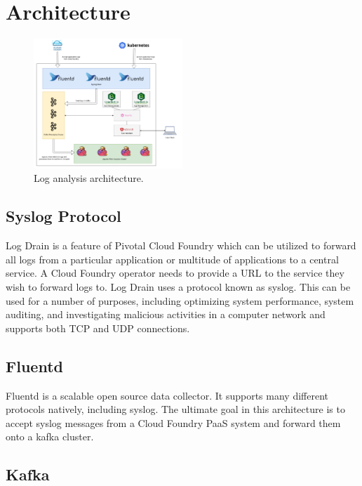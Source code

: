 \section{Architecture}

\begin{figure}[ht!]
  \centering
    \includegraphics[width=0.5\textwidth]{images/architecture.png}
  \caption{Log analysis architecture.}
\end{figure}

\subsection{Syslog Protocol}

Log Drain is a feature of Pivotal Cloud Foundry which can be utilized to forward all logs from a particular application or multitude of applications to a central service. A Cloud Foundry operator needs to provide a URL to the service they wish to forward logs to. Log Drain uses a protocol known as syslog. This
can be used for a number of purposes, including optimizing
system performance, system auditing, and investigating malicious
activities in a computer network\cite{6827714} and supports both TCP and UDP connections.

\subsection{Fluentd}

Fluentd is a scalable open source data collector. It supports many different protocols natively, including syslog. The ultimate goal in this architecture is to accept syslog messages from a Cloud Foundry PaaS system and forward them onto a kafka cluster.

\subsection{Kafka}

